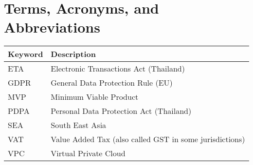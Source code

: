 \chapter*{Terms, Acronyms, and Abbreviations}

\begin{tabular}{@{}>{\raggedright\arraybackslash}p{2cm} p{}@{}}
	\textbf{Keyword} & \textbf{Description} \\
	\hline
	ETA  & Electronic Transactions Act (Thailand) \\
	GDPR & General Data Protection Rule (EU) \\
	MVP  & Minimum Viable Product \\
	PDPA  & Personal Data Protection Act (Thailand) \\
	SEA & South East Asia \\
	VAT & Value Added Tax (also called GST in some jurisdictions) \\
	VPC & Virtual Private Cloud \\
	\hline
\end{tabular}

\vspace{1cm}


\clearpage
